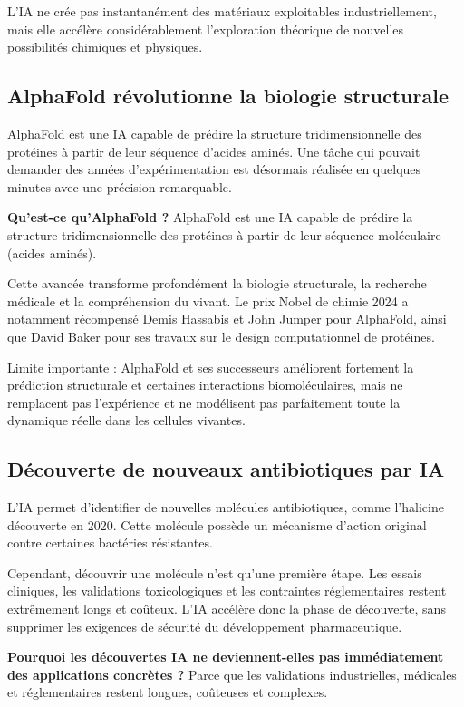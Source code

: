 \documentclass[
  10pt,
  a4paper,
  DIV=11,
  numbers=noendperiod,
  oneside]{scrreprt}
\let\oldtextbf\textbf
\renewcommand{\textbf}[1]{\oldtextbf{\textcolor{cmmnavy}{#1}}}
\begin{document}
L'IA ne crée pas instantanément des matériaux exploitables
industriellement, mais elle accélère considérablement l'exploration
théorique de nouvelles possibilités chimiques et physiques.

\subsection{AlphaFold révolutionne la biologie
structurale}\label{alphafold-ruxe9volutionne-la-biologie-structurale}

AlphaFold est une IA capable de prédire la structure tridimensionnelle
des protéines à partir de leur séquence d'acides aminés. Une tâche qui
pouvait demander des années d'expérimentation est désormais réalisée en
quelques minutes avec une précision remarquable.

\textbf{Qu'est-ce qu'AlphaFold ?} AlphaFold est une IA capable de
prédire la structure tridimensionnelle des protéines à partir de leur
séquence moléculaire (acides aminés).

Cette avancée transforme profondément la biologie structurale, la
recherche médicale et la compréhension du vivant. Le prix Nobel de
chimie 2024 a notamment récompensé Demis Hassabis et John Jumper pour
AlphaFold, ainsi que David Baker pour ses travaux sur le design
computationnel de protéines.

Limite importante : AlphaFold et ses successeurs améliorent fortement la
prédiction structurale et certaines interactions biomoléculaires, mais
ne remplacent pas l'expérience et ne modélisent pas parfaitement toute
la dynamique réelle dans les cellules vivantes.

\subsection{Découverte de nouveaux antibiotiques par
IA}\label{duxe9couverte-de-nouveaux-antibiotiques-par-ia}

L'IA permet d'identifier de nouvelles molécules antibiotiques, comme
l'halicine découverte en 2020. Cette molécule possède un mécanisme
d'action original contre certaines bactéries résistantes.

Cependant, découvrir une molécule n'est qu'une première étape. Les
essais cliniques, les validations toxicologiques et les contraintes
réglementaires restent extrêmement longs et coûteux. L'IA accélère donc
la phase de découverte, sans supprimer les exigences de sécurité du
développement pharmaceutique.

\textbf{Pourquoi les découvertes IA ne deviennent-elles pas
immédiatement des applications concrètes ?} Parce que les validations
industrielles, médicales et réglementaires restent longues, coûteuses et
complexes.
\end{document}
